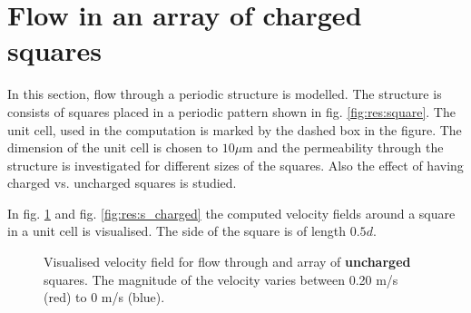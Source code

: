 \section{Flow in an array of charged squares}

In this section, flow through a periodic structure is modelled. The
structure is consists of squares placed in a periodic pattern shown in
fig. \ref{fig:res:square}. The unit cell, used in the computation is
marked by the dashed box in the figure. The dimension of the unit cell
is chosen to $10 \mu$m and the permeability through the structure is
investigated for different sizes of the squares. Also the effect of
having charged vs. uncharged squares is studied. 

In fig. \ref{fig:res:s_uncharged} and fig. \ref{fig:res:s_charged} the
computed velocity fields around a square in a unit cell is
visualised. The side of the square is of length $0.5d$.   

\begin{figure}
  \centering
  \hspace{5pt} 
  \caption{Visualised velocity field for flow through and array of
    \textbf{uncharged} squares. The magnitude of the velocity varies
    between 0.20 m/s (red) to 0 m/s (blue).}
  \label{fig:res:s_uncharged}
\end{figure}


